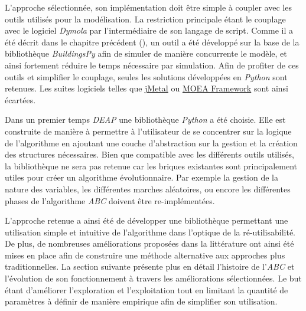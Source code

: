 L’approche sélectionnée, son implémentation doit être simple à coupler avec les outils
utilisés pour la modélisation. La restriction principale étant le couplage avec
le logiciel \textit{Dymola} par l’intermédiaire de son langage de script. Comme il a été
décrit dans le chapitre précédent (), un outil a été
développé sur la base de la bibliothèque \textit{BuildingsPy} afin de simuler de manière
concurrente le modèle, et ainsi fortement réduire le temps nécessaire par
simulation. Afin de profiter de ces outils et simplifier le couplage, seules les
solutions développées en \textit{Python} sont retenues. Les suites logiciels telles que
\href{http://jmetal.sourceforge.net/index.html}{jMetal} ou
\href{http://moeaframework.org/index.html}{MOEA Framework} sont ainsi écartées.

Dans un premier temps \textit{DEAP} \parencite{Fortin20122171} une bibliothèque
\textit{Python} a été choisie. Elle est construite de manière à permettre à
l’utilisateur de se concentrer sur la logique de l’algorithme en ajoutant une
couche d’abstraction sur la gestion et la création des structures nécessaires.
Bien que compatible avec les différents outils utilisés, la bibliothèque ne sera
pas retenue car les briques existantes sont principalement utiles pour créer un
algorithme évolutionnaire. Par exemple la gestion de la nature des variables,
les différentes marches aléatoires, ou encore les différentes phases de
l’algorithme \textit{ABC} doivent être re-implémentées.

L’approche retenue a ainsi été de développer une bibliothèque permettant une utilisation
simple et intuitive de l’algorithme dans l’optique de la ré-utilisabilité. De plus,
de nombreuses améliorations proposées dans la littérature ont ainsi été mises en place
afin de construire une méthode alternative aux approches plus traditionnelles.
La section suivante présente plus en détail l’histoire de l’\textit{ABC} et l’évolution de
son fonctionnement à travers les améliorations sélectionnées.
Le but étant d’améliorer l’exploration et l’exploitation tout en limitant la quantité
de paramètres à définir de manière empirique afin de simplifier son utilisation.



